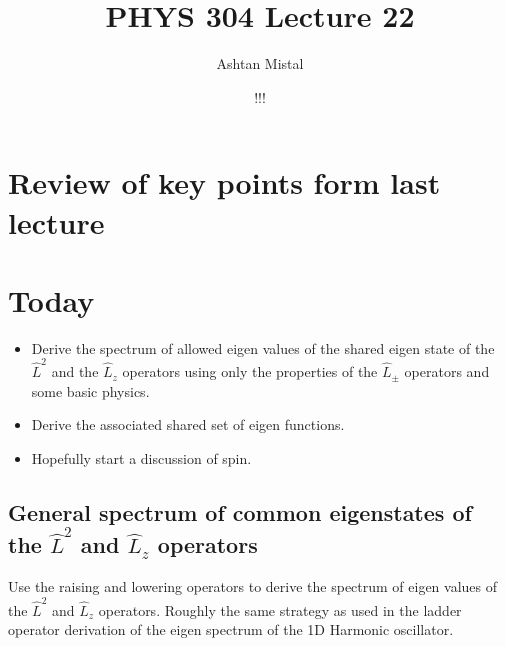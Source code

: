 \documentclass{article}
\title{PHYS 304 Lecture 22}
\author{Ashtan Mistal}
\date{!!!}
\begin{document}
\ifstandalone
\maketitle
\fi

\graphicspath{{./Lecture22/}}


\section{Review of key points form last lecture}


\section{Today}

\begin{itemize}
    \item Derive the spectrum of allowed eigen values of the shared eigen state of the $\hat{L}^2$ and the $\hat{L}_z$ operators using only the properties of the $\hat{L}_\pm$ operators and some basic physics.
    \item Derive the associated shared set of eigen functions. 
    
    \item Hopefully start a discussion of spin.

\end{itemize}

 \subsection{General spectrum of common eigenstates of the $\hat{L}^2$ and $\hat{L}_z$ operators}
 
 Use the raising and lowering operators to derive the spectrum of eigen values of the  $\hat{L}^2$ and $\hat{L}_z$ operators.  Roughly the same strategy as used in the ladder operator derivation of the eigen spectrum of the 1D Harmonic oscillator.
\end{document}
